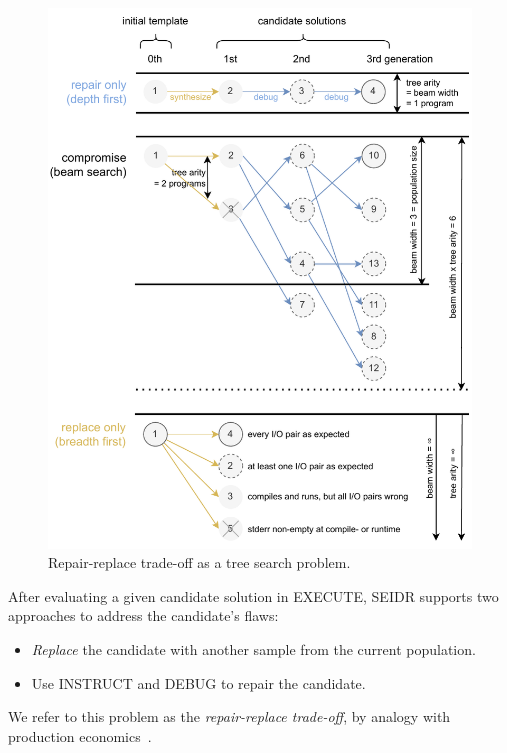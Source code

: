 \begin{figure}[p]
    \centering
    \includegraphics[width=\linewidth, trim={0mm 4mm 0mm 0mm}]{images/beamsearch.pdf}
    \caption{Repair-replace trade-off as a tree search problem.}
    \label{fig:beam-search}
\end{figure}

After evaluating a given candidate solution in EXECUTE, SEIDR supports two approaches to address the candidate's flaws:
\begin{itemize}
\setlength{\parskip}{0pt}
\setlength\itemsep{0pt}
  \item \emph{Replace} the candidate with another sample from the current population.
  \item Use INSTRUCT and DEBUG to repair the candidate.
\end{itemize}
We refer to this problem as the \emph{repair-replace trade-off}, by analogy with production economics~\cite{jack2000:optimal}. 

